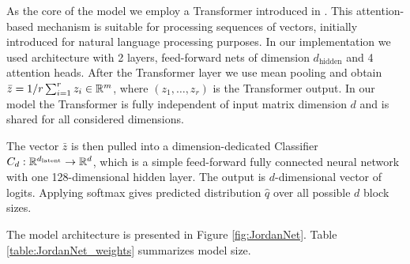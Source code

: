 As the core of the model we employ a Transformer introduced in \cite{Attention}. This attention-based mechanism is suitable for processing sequences of vectors, initially introduced for natural language processing purposes. In our implementation we used architecture with 2 layers, feed-forward nets of dimension $d_{\mathrm{hidden}}$ and 4 attention heads. After the Transformer layer we use mean pooling and obtain $\bar{z} = 1/r \sum_{i=1}^r z_i \in \mathbb{R}^{m}$, where $(z_1, \dots, z_r)$ is the Transformer output. In our model the Transformer is fully independent of input matrix dimension $d$ and is shared for all considered dimensions. 

The vector $\bar{z}$ is then pulled into a dimension-dedicated Classifier $C_d : \mathbb{R}^{d_{\mathrm{latent}}} \rightarrow \mathbb{R}^d$, which is a simple feed-forward fully connected neural network with one 128-dimensional hidden layer. The output is $d$-dimensional vector of logits. Applying softmax gives predicted distribution $\hat{q}$ over all possible $d$ block sizes.

The model architecture is presented in Figure \ref{fig:JordanNet}. Table \ref{table:JordanNet_weights} summarizes model size.


